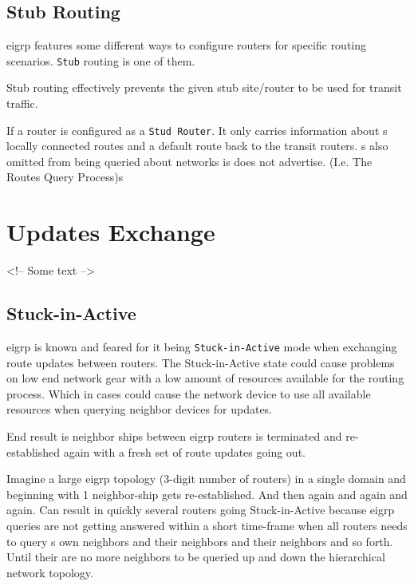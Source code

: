\subsection{Stub Routing}

\gls{eigrp} features some different ways to configure routers for specific routing scenarios. \texttt{Stub} routing is one of them.

Stub routing effectively prevents the given stub site/router to be used for transit traffic.

If a router is configured as a \texttt{Stud Router}. It only carries information about s locally connected routes and a default route back to the transit routers. s also omitted from being queried about networks is does not advertise. {\small (I.e. The Routes Query Process)}s

\section{Updates Exchange}

<!-- Some text -->

\subsection[SIA]{Stuck-in-Active}
\gls{eigrp} is known and feared for it being \texttt{Stuck-in-Active} mode when exchanging route updates between routers. The Stuck-in-Active state could cause problems on low end network gear with a low amount of resources available for the routing process. Which in cases could cause the network device to use all available resources when querying neighbor devices for updates.


End result is neighbor ships between \gls{eigrp} routers is terminated and re-established again with a fresh set of route updates going out.

Imagine a large \gls{eigrp} topology (3-digit number of routers) in a single domain and beginning with 1 neighbor-ship gets re-established. And then again and again and again. Can result in quickly several routers going Stuck-in-Active because \gls{eigrp} queries are not getting answered within a short time-frame when all routers needs to query s own neighbors and their neighbors and their neighbors and so forth. Until their are no more neighbors to be queried up and down the hierarchical network topology.

